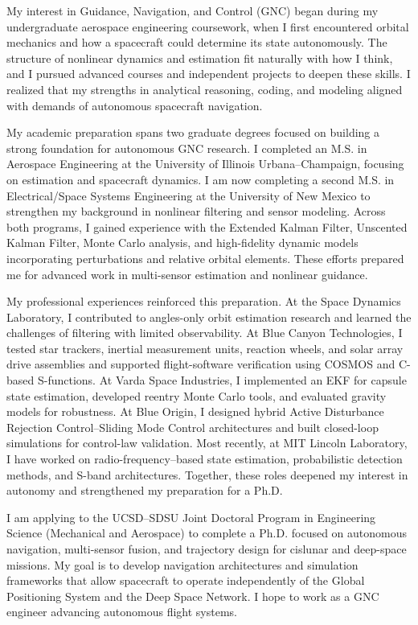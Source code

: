 \documentclass[11pt]{article}
\begin{document}
	
	My interest in Guidance, Navigation, and Control (GNC) began during my undergraduate aerospace engineering coursework, when I first encountered orbital mechanics and how a spacecraft could determine its state autonomously. The structure of nonlinear dynamics and estimation fit naturally with how I think, and I pursued advanced courses and independent projects to deepen these skills. I realized that my strengths in analytical reasoning, coding, and modeling aligned with demands of autonomous spacecraft navigation.
	
	My academic preparation spans two graduate degrees focused on building a strong foundation for autonomous GNC research. I completed an M.S. in Aerospace Engineering at the University of Illinois Urbana–Champaign, focusing on estimation and spacecraft dynamics. I am now completing a second M.S. in Electrical/Space Systems Engineering at the University of New Mexico to strengthen my background in nonlinear filtering and sensor modeling. Across both programs, I gained experience with the Extended Kalman Filter, Unscented Kalman Filter, Monte Carlo analysis, and high-fidelity dynamic models incorporating perturbations and relative orbital elements. These efforts prepared me for advanced work in multi-sensor estimation and nonlinear guidance.
	
	My professional experiences reinforced this preparation. At the Space Dynamics Laboratory, I contributed to angles-only orbit estimation research and learned the challenges of filtering with limited observability. At Blue Canyon Technologies, I tested star trackers, inertial measurement units, reaction wheels, and solar array drive assemblies and supported flight-software verification using COSMOS and C-based S-functions. At Varda Space Industries, I implemented an EKF for capsule state estimation, developed reentry Monte Carlo tools, and evaluated gravity models for robustness. At Blue Origin, I designed hybrid Active Disturbance Rejection Control–Sliding Mode Control architectures and built closed-loop simulations for control-law validation. Most recently, at MIT Lincoln Laboratory, I have worked on radio-frequency–based state estimation, probabilistic detection methods, and S-band architectures. Together, these roles deepened my interest in autonomy and strengthened my preparation for a Ph.D.
	
	I am applying to the UCSD–SDSU Joint Doctoral Program in Engineering Science (Mechanical and Aerospace) to complete a Ph.D. focused on autonomous navigation, multi-sensor fusion, and trajectory design for cislunar and deep-space missions. My goal is to develop navigation architectures and simulation frameworks that allow spacecraft to operate independently of the Global Positioning System and the Deep Space Network. I hope to work as a GNC engineer advancing autonomous flight systems.
	
\end{document}
